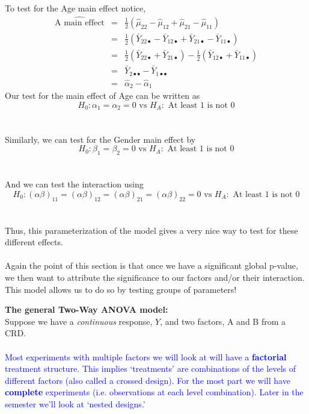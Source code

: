 To test for the Age main effect notice, 
\begin{eqnarray*}
\hat{\mbox{A main effect}}&=&\frac{1}{2}(\hat{\mu}_{22}-\hat{\mu}_{12}+\hat{\mu}_{21}-\hat{\mu}_{11})\\
&= & \frac{1}{2}(\bar{Y}_{22\bullet}-\bar{Y}_{12\bullet}+\bar{Y}_{21\bullet}-\bar{Y}_{11\bullet})\\
& = & \frac{1}{2}(\bar{Y}_{22\bullet}+\bar{Y}_{21\bullet})-\frac{1}{2}(\bar{Y}_{12\bullet}+\bar{Y}_{11\bullet})\\
& = & \bar{Y}_{2\bullet\bullet}-\bar{Y}_{1\bullet\bullet} \\
&=& \hat{\alpha}_{2}-\hat{\alpha}_{1}
\end{eqnarray*}
Our test for the main effect of Age can be written as
$$H_0: \alpha_{1}=\alpha_{2}=0\mbox{ vs } H_A:\mbox{ At least 1 is not 0}$$~\\~\\
Similarly, we can test for the Gender main effect by
$$H_0: \beta_{1}=\beta_{2}=0\mbox{ vs } H_A:\mbox{ At least 1 is not 0}$$~\\~\\
And we can test the interaction using 
$$H_0: (\alpha\beta)_{11}=(\alpha\beta)_{12}=(\alpha\beta)_{21}=(\alpha\beta)_{22}=0\mbox{ vs } H_A:\mbox{ At least 1 is not 0}$$~\\~\\
Thus, this parameterization of the model gives a very nice way to test for these different effects.\\~\\
Again the point of this section is that once we have a significant global p-value, we then want to attribute the significance to our factors and/or their interaction.  This model allows us to do so by testing groups of parameters!

\newpage

\Large\textbf{The general Two-Way ANOVA model:}\large\\
Suppose we have a \textit{continuous} response, $Y$, and two factors, A and B from a CRD. \\~\\

\textcolor{blue}{Most experiments with multiple factors we will look at will have a \textbf{factorial} treatment structure.  This implies `treatments' are combinations of the levels of different factors (also called a crossed design).  For the most part we will have \textbf{complete} experiments (i.e. observations at each level combination).  Later in the semester we'll look at `nested designs.'}


